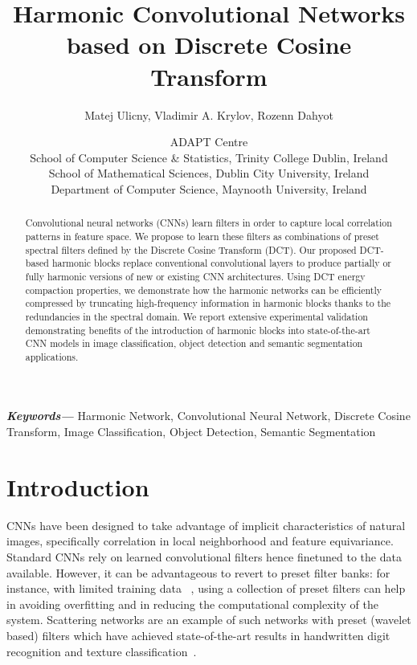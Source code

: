 \documentclass[12pt,a4paper]{article}
\providecommand{\keywords}[1]
{
  \small	
  \textbf{\textit{Keywords---}} #1
}
\begin{document}
\title{Harmonic Convolutional Networks based on Discrete Cosine Transform}

\author{Matej Ulicny, Vladimir A. Krylov, Rozenn Dahyot}
\date{
    ADAPT Centre\\
    School of Computer Science \& Statistics, Trinity College Dublin, Ireland\\
    School of Mathematical Sciences, Dublin City University, Ireland\\
    Department  of Computer Science, Maynooth University, Ireland\\
}

\maketitle

\begin{abstract}
\noindent Convolutional neural networks (CNNs) learn filters in order to capture local correlation patterns in feature space. 
We propose to learn these filters as combinations of preset spectral filters defined by the Discrete Cosine Transform (DCT).
Our proposed DCT-based harmonic blocks  replace conventional convolutional layers to produce partially or fully harmonic versions of new or existing CNN architectures. 
Using DCT energy compaction properties, we demonstrate how the harmonic networks can be efficiently compressed  by truncating high-frequency information in harmonic blocks thanks to the redundancies in the spectral domain.
We report extensive experimental validation demonstrating benefits of the introduction of harmonic blocks into state-of-the-art CNN models in image classification, object detection and semantic segmentation applications.
\end{abstract}

\keywords{
Harmonic Network, Convolutional Neural Network, Discrete Cosine Transform, Image Classification, Object Detection, Semantic Segmentation
}

\section{Introduction}\label{sec:introduction}

CNNs have been designed to take advantage of implicit characteristics of natural images, specifically correlation in local neighborhood and feature equivariance.
Standard CNNs rely on learned convolutional filters hence finetuned to the data available. However, it can be advantageous to revert to preset filter banks: for instance, with limited training data ~\cite{Ulicny19}, using a  collection of preset filters can help in avoiding overfitting and in reducing the computational complexity of the system.
Scattering networks are an example of such networks with preset (wavelet based) filters  which have achieved state-of-the-art results in handwritten digit recognition and texture classification~\cite{Bruna13}.
\end{document}
